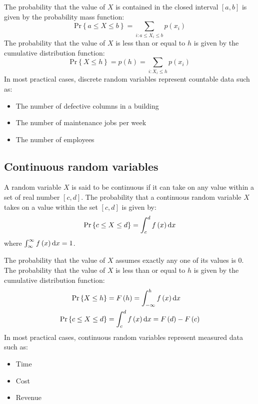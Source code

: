 The probability that the value of $X$ is contained in the closed interval $\left[a,b\right]$ is given by the probability mass function:
\begin{equation}
    \textrm{Pr} \left\{ a \leq X \leq b \right\} = \sum_{ i:a\leq X_i \leq b } p\left(x_i\right)
\end{equation}
The probability that the value of $X$ is less than or equal to $h$ is given by the cumulative distribution function:
\begin{equation}
    \textrm{Pr} \left\{ X \leq h\right\} = p\left(h\right) = \sum_{i:X_i\leq h} p\left(x_i\right)
\end{equation}
In most practical cases, discrete random variables represent countable data such as:
\begin{itemize}
    \item The number of defective columns in a building
    \item The number of maintenance jobs per week
    \item The number of employees
\end{itemize}
\subsection{Continuous random variables}
A random variable $X$ is said to be continuous if it can take on any value within a set of real number $\left[c,d\right]$. The probability that a continuous random variable $X$ takes on a value within the set $\left[c,d\right]$ is given by:
\begin{equation}
    \textrm{Pr}\left\{c\leq X \leq d\right\} = \int_c^d f\left(x\right)\dif x
\end{equation}
where $\int_{\infty}^{\infty}f\left(x\right)\dif x = 1$.

The probability that the value of $X$ assumes exactly any one of its values is 0. The probability that the value of $X$ is less than or equal to $h$ is given by the cumulative distribution function:
\begin{align}
    \textrm{Pr}\left\{X\leq h\right\}         & = F\left(h\right) = \int_{-\infty}^h f\left(x\right)\dif x            \\
    \textrm{Pr}\left\{c \leq X \leq d\right\} & = \int_c^d f\left(x\right) \dif x = F\left(d\right) - F\left(c\right)
\end{align}
In most practical cases, continuous random variables represent measured data such as:
\begin{itemize}
    \item Time
    \item Cost
    \item Revenue
\end{itemize}
